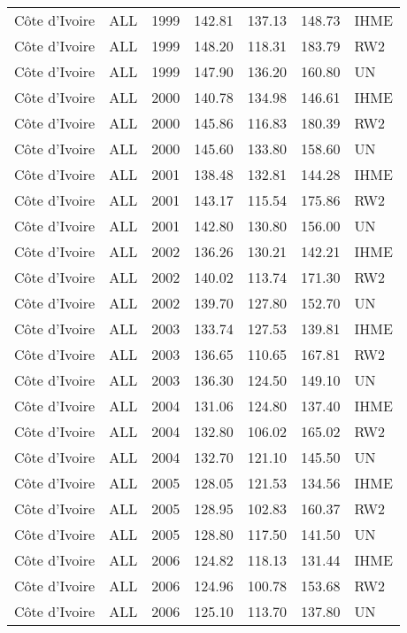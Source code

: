 \begin{longtable}{lllrrrl}
  C\^{o}te d'Ivoire & ALL & 1999 & 142.81 & 137.13 & 148.73 & IHME \\ 
  C\^{o}te d'Ivoire & ALL & 1999 & 148.20 & 118.31 & 183.79 & RW2 \\ 
  C\^{o}te d'Ivoire & ALL & 1999 & 147.90 & 136.20 & 160.80 & UN \\ 
  C\^{o}te d'Ivoire & ALL & 2000 & 140.78 & 134.98 & 146.61 & IHME \\ 
  C\^{o}te d'Ivoire & ALL & 2000 & 145.86 & 116.83 & 180.39 & RW2 \\ 
  C\^{o}te d'Ivoire & ALL & 2000 & 145.60 & 133.80 & 158.60 & UN \\ 
  C\^{o}te d'Ivoire & ALL & 2001 & 138.48 & 132.81 & 144.28 & IHME \\ 
  C\^{o}te d'Ivoire & ALL & 2001 & 143.17 & 115.54 & 175.86 & RW2 \\ 
  C\^{o}te d'Ivoire & ALL & 2001 & 142.80 & 130.80 & 156.00 & UN \\ 
  C\^{o}te d'Ivoire & ALL & 2002 & 136.26 & 130.21 & 142.21 & IHME \\ 
  C\^{o}te d'Ivoire & ALL & 2002 & 140.02 & 113.74 & 171.30 & RW2 \\ 
  C\^{o}te d'Ivoire & ALL & 2002 & 139.70 & 127.80 & 152.70 & UN \\ 
  C\^{o}te d'Ivoire & ALL & 2003 & 133.74 & 127.53 & 139.81 & IHME \\ 
  C\^{o}te d'Ivoire & ALL & 2003 & 136.65 & 110.65 & 167.81 & RW2 \\ 
  C\^{o}te d'Ivoire & ALL & 2003 & 136.30 & 124.50 & 149.10 & UN \\ 
  C\^{o}te d'Ivoire & ALL & 2004 & 131.06 & 124.80 & 137.40 & IHME \\ 
  C\^{o}te d'Ivoire & ALL & 2004 & 132.80 & 106.02 & 165.02 & RW2 \\ 
  C\^{o}te d'Ivoire & ALL & 2004 & 132.70 & 121.10 & 145.50 & UN \\ 
  C\^{o}te d'Ivoire & ALL & 2005 & 128.05 & 121.53 & 134.56 & IHME \\ 
  C\^{o}te d'Ivoire & ALL & 2005 & 128.95 & 102.83 & 160.37 & RW2 \\ 
  C\^{o}te d'Ivoire & ALL & 2005 & 128.80 & 117.50 & 141.50 & UN \\ 
  C\^{o}te d'Ivoire & ALL & 2006 & 124.82 & 118.13 & 131.44 & IHME \\ 
  C\^{o}te d'Ivoire & ALL & 2006 & 124.96 & 100.78 & 153.68 & RW2 \\ 
  C\^{o}te d'Ivoire & ALL & 2006 & 125.10 & 113.70 & 137.80 & UN \\ 

\end{longtable}

